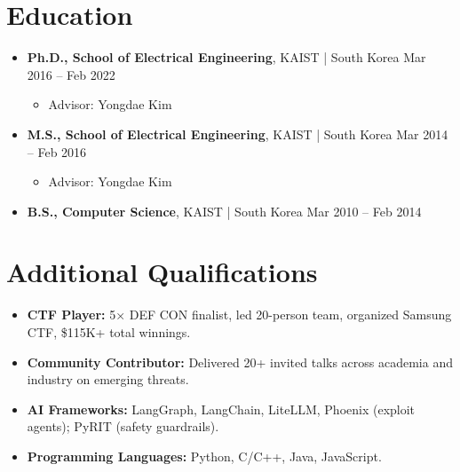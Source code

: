 \documentclass[11pt,letterpaper]{article}
\newcommand{\jobtitle}[1]{\textbf{#1}}
\newcommand{\location}[1]{\textcolor{secondary}{\small #1}}
\newcommand{\daterange}[1]{\textcolor{secondary}{\small #1}}
\begin{document}
\section{Education}
\begin{itemize}[]
\item \jobtitle{Ph.D., School of Electrical Engineering}, \location{KAIST | South Korea} \hfill \daterange{Mar 2016 -- Feb 2022}
    \begin{itemize}[] %
    \item Advisor: Yongdae Kim
    \end{itemize}
\item \jobtitle{M.S., School of Electrical Engineering}, \location{KAIST | South Korea} \hfill \daterange{Mar 2014 -- Feb 2016}
    \begin{itemize}[] %
    \item Advisor: Yongdae Kim
    \end{itemize}
\item \jobtitle{B.S., Computer Science}, \location{KAIST | South Korea} \hfill \daterange{Mar 2010 -- Feb 2014}
\end{itemize}

\section{Additional Qualifications}
\begin{itemize}[itemsep=3pt]

\item \textbf{CTF Player:}
    5× DEF CON finalist, led 20-person team, organized Samsung CTF, \$115K+ total winnings.
\item \textbf{Community Contributor:}
    Delivered 20+ invited talks across academia and industry on emerging threats.
\item \textbf{AI Frameworks:} LangGraph, LangChain, LiteLLM, Phoenix (exploit agents); PyRIT (safety guardrails).
\item \textbf{Programming Languages:} Python, C/C++, Java, JavaScript.
\end{itemize}
\end{document}
